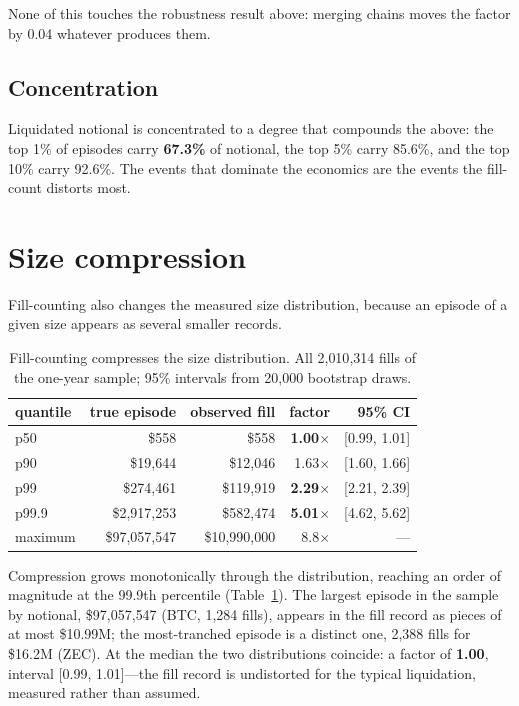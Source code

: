 \documentclass[11pt,a4paper]{article}
\begin{document}
None of this touches the robustness result above: merging chains moves the factor by 0.04
whatever produces them.

\subsection{Concentration}

Liquidated notional is concentrated to a degree that compounds the above: the top 1\% of
episodes carry \textbf{67.3\%} of notional, the top 5\% carry 85.6\%, and the top 10\% carry
92.6\%. The events that dominate the economics are the events the fill-count distorts most.

\section{Size compression}
\label{sec:compression}

Fill-counting also changes the measured size distribution, because an episode of a given size
appears as several smaller records.

\begin{table}[htbp]
\centering
\caption{Fill-counting compresses the size distribution. All 2{,}010{,}314 fills of the one-year
sample; 95\% intervals from 20{,}000 bootstrap draws.}
\label{tab:compression}
\begin{tabular}{lrrrr}
\toprule
quantile & true episode & observed fill & factor & 95\% CI \\
\midrule
p50 & \$558 & \$558 & \textbf{1.00$\times$} & [0.99, 1.01] \\
p90 & \$19{,}644 & \$12{,}046 & 1.63$\times$ & [1.60, 1.66] \\
p99 & \$274{,}461 & \$119{,}919 & \textbf{2.29$\times$} & [2.21, 2.39] \\
p99.9 & \$2{,}917{,}253 & \$582{,}474 & \textbf{5.01$\times$} & [4.62, 5.62] \\
maximum & \$97{,}057{,}547 & \$10{,}990{,}000 & 8.8$\times$ & --- \\
\bottomrule
\end{tabular}
\end{table}

Compression grows monotonically through the distribution, reaching an order of magnitude at the
99.9th percentile (Table~\ref{tab:compression}). The largest episode in the sample by
notional, \$97{,}057{,}547 (BTC, 1{,}284 fills), appears in the fill record as pieces of at
most \$10.99M; the most-tranched episode is a distinct one, 2{,}388 fills for \$16.2M (ZEC).
At the median the two distributions coincide: a factor of \textbf{1.00}, interval
[0.99, 1.01]---the fill record is undistorted for the typical liquidation, measured rather than
assumed.
\end{document}
